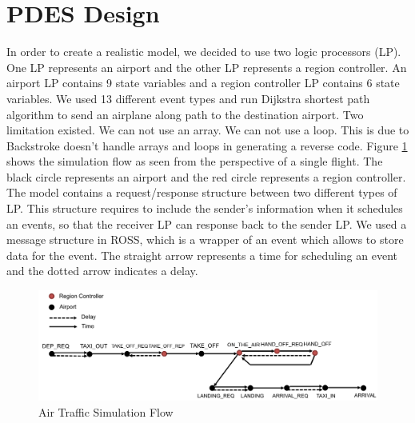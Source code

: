\section{PDES Design}

In order to create a realistic model, we decided to use two logic processors (LP). 
One LP represents an airport and the other LP represents a region controller.
An airport LP contains 9 state variables and a region controller LP contains 6 state variables.
We used 13 different event types and run Dijkstra shortest path algorithm to send an airplane along path to the destination airport.
Two limitation existed. We can not use an array. We can not use a loop. 
This is due to Backstroke doesn't handle arrays and loops in generating a reverse code.  
Figure \ref{fig:sim_flow} shows the simulation flow as seen from the perspective of a single flight.
The black circle represents an airport and the red circle represents a region controller. 
The model contains a request/response structure between two different types of LP.
This structure requires to include the sender's information when it schedules an events, so that 
the receiver LP can response back to the sender LP.
We used a message structure in ROSS, which is a wrapper of an event which allows to store data for the event. 
The straight arrow represents a time for scheduling an event and the dotted arrow indicates a delay. 


\begin{figure} [h]
\centering
\includegraphics[width=5.2in]{figs/sim_flow.png}
\caption{Air Traffic Simulation Flow}
\label{fig:sim_flow}
\end{figure}